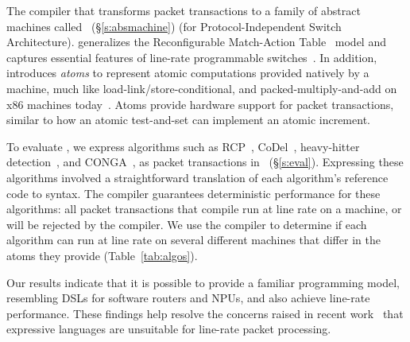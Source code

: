 
The \pktlanguage compiler that transforms packet transactions to a
family of abstract machines called \absmachine~(\S\ref{s:absmachine})
(for Protocol-Independent Switch Architecture). \absmachine
generalizes the Reconfigurable Match-Action Table~\cite{rmt} model and
captures essential features of line-rate programmable
switches~\cite{rmt, xpliant, flexpipe}. In addition, \absmachine
introduces {\em atoms} to represent atomic computations provided
natively by a \absmachine machine, much like
load-link/store-conditional, and packed-multiply-and-add on x86
machines today~\cite{x86_manual}.  Atoms provide hardware support for
packet transactions, similar to how an atomic test-and-set can
implement an atomic increment.

To evaluate \pktlanguage, we express algorithms such as
RCP~\cite{rcp}, CoDel~\cite{codel}, heavy-hitter
detection~\cite{opensketch}, and CONGA~\cite{conga}, as packet
transactions in \pktlanguage~(\S\ref{s:eval}). Expressing these
algorithms involved a straightforward translation of each algorithm's
reference code to \pktlanguage syntax.  The \pktlanguage compiler
guarantees deterministic performance for these algorithms: all packet
transactions that compile run at line rate on a \absmachine machine,
or will be rejected by the compiler.  We use the \pktlanguage compiler
to determine if each algorithm can run at line rate on several
different \absmachine machines that differ in the atoms they provide
(Table~\ref{tab:algos}).

Our results indicate that it is possible to provide a familiar
programming model, resembling DSLs for software routers and NPUs, and
also achieve line-rate performance. These findings help resolve the
concerns raised in recent work~\cite{p4} that expressive languages are
unsuitable for line-rate packet processing.
